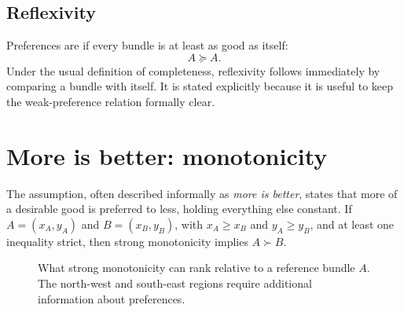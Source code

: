 \subsection{Reflexivity}

Preferences are  if every bundle is at least as good as itself:
\[
A\succeq A.
\]
Under the usual definition of completeness, reflexivity follows immediately by
comparing a bundle with itself. It is stated explicitly because it is useful
to keep the weak-preference relation formally clear.

\section{More is better: monotonicity}

The  assumption, often described informally as
\emph{more is better}, states that more of a desirable good is preferred to
less, holding everything else constant. If $A=(x_A,y_A)$ and $B=(x_B,y_B)$,
with $x_A\geq x_B$ and $y_A\geq y_B$, and at least one inequality strict,
then strong monotonicity implies $A\succ B$.

\begin{figure}[!ht]
\centering
{}
\caption{What strong monotonicity can rank relative to a reference bundle
$A$. The north-west and south-east regions require additional information
about preferences.}
\label{fig:monotonicity-regions}
\end{figure}

